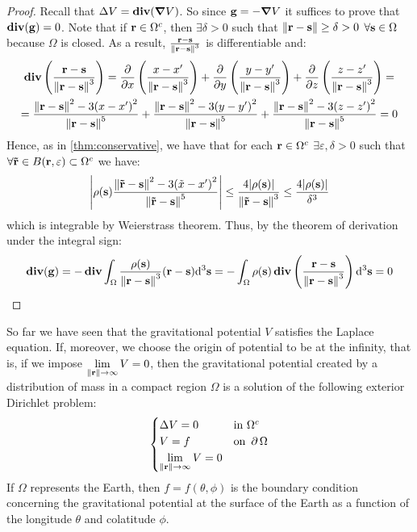 \documentclass[../main.tex]{subfiles}
\begin{document}
\begin{proof}
  Recall that $\laplacian V=\div(\grad V)$. So since $\vf{g}=-\grad V$ it suffices to prove that $\div(\vf{g})=0$. Note that if $\vf{r}\in\Omega^c$, then $\exists \delta>0$ such that $\norm{\vf{r}-\vf{s}}\geq\delta>0$ $\forall \vf{s}\in\Omega$ because $\Omega$ is closed. As a result, $\frac{\vf{r}-\vf{s}}{\norm{\vf{r}-\vf{s}}^3}$ is differentiable and:
  \begin{multline*}
    \div\left(\frac{\vf{r}-\vf{s}}{\norm{\vf{r}-\vf{s}}^3}\right)=\pdv{}{x}\left(\frac{x-x'}{\norm{\vf{r}-\vf{s}}^3}\right)+\pdv{}{y}\left(\frac{y-y'}{\norm{\vf{r}-\vf{s}}^3}\right)+\pdv{}{z}\left(\frac{z-z'}{\norm{\vf{r}-\vf{s}}^3}\right)=\\
    =\frac{\norm{\vf{r}-\vf{s}}^2-3{(x-x')}^2}{\norm{\vf{r}-\vf{s}}^5}+\frac{\norm{\vf{r}-\vf{s}}^2-3{(y-y')}^2}{\norm{\vf{r}-\vf{s}}^5}+\frac{\norm{\vf{r}-\vf{s}}^2-3{(z-z')}^2}{\norm{\vf{r}-\vf{s}}^5} =0
  \end{multline*}
  Hence, as in \cref{thm:conservative}, we have that for each $\vf{r}\in\Omega^c$ $\exists\varepsilon,\delta>0$ such that $\forall \vf{\tilde{r}} \in B(\vf{r},\varepsilon)\subset\Omega^c$ we have:
  \begin{equation}
    \abs{\rho(\vf{s})\frac{\norm{\vf{\tilde{r}}-\vf{s}}^2-3{(\tilde{x}-x')}^2}{\norm{\vf{\tilde{r}}-\vf{s}}^5}}\leq \frac{4\abs{\rho(\vf{s})}}{\norm{\vf{\tilde{r}}-\vf{s}}^3}\leq \frac{4\abs{\rho(\vf{s})}}{\delta^3}
  \end{equation}
  which is integrable by Weierstrass theorem. Thus, by the theorem of derivation under the integral sign:
  \begin{equation}
    \div(\vf{g})=-\div\int_\Omega\frac{\rho(\vf{s})}{\norm{\vf{r}-\vf{s}}^3}(\vf{r}-\vf{s})\dd^3{\vf{s}}=-\int_\Omega\rho(\vf{s})\div\left(\frac{\vf{r}-\vf{s}}{\norm{\vf{r}-\vf{s}}^3}\right)\dd^3{\vf{s}}=0
  \end{equation}
\end{proof}
So far we have seen that the gravitational potential $V$ satisfies the Laplace equation. If, moreover, we choose the origin of potential to be at the infinity, that is, if we impose $\displaystyle\lim_{\norm{\vf{r}}\to\infty}V=0$, then the gravitational potential created by a distribution of mass in a compact region $\Omega$ is a solution of the following exterior Dirichlet problem:
\begin{equation}\label{eq:dirichletProblem}
  \begin{cases}
    \laplacian V = 0 & \text{in } \Omega^c    \\
    V = f            & \text{on } \Fr{\Omega} \\
    \displaystyle\lim_{\norm{\vf{r}}\to\infty}V=0
  \end{cases}
\end{equation}
If $\Omega$ represents the Earth, then $f=f(\theta,\phi)$ is the boundary condition concerning the gravitational potential at the surface of the Earth as a function of the longitude $\theta$ and colatitude $\phi$.
\end{document}
